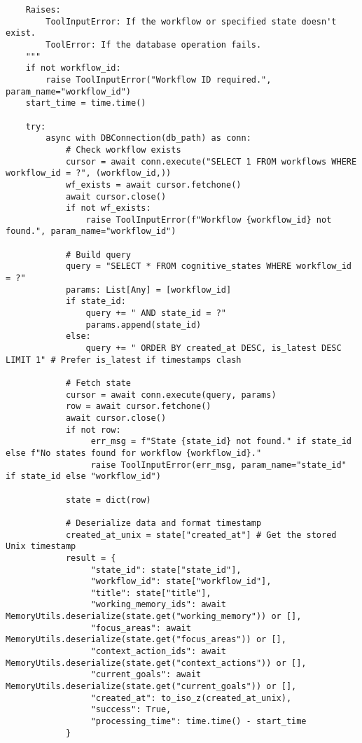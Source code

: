 \documentclass[12pt,a4paper]{article}
\begin{document}
\begin{pageablecode}
\begin{verbatim}
    Raises:
        ToolInputError: If the workflow or specified state doesn't exist.
        ToolError: If the database operation fails.
    """
    if not workflow_id:
        raise ToolInputError("Workflow ID required.", param_name="workflow_id")
    start_time = time.time()

    try:
        async with DBConnection(db_path) as conn:
            # Check workflow exists
            cursor = await conn.execute("SELECT 1 FROM workflows WHERE workflow_id = ?", (workflow_id,))
            wf_exists = await cursor.fetchone()
            await cursor.close()
            if not wf_exists:
                raise ToolInputError(f"Workflow {workflow_id} not found.", param_name="workflow_id")

            # Build query
            query = "SELECT * FROM cognitive_states WHERE workflow_id = ?"
            params: List[Any] = [workflow_id]
            if state_id:
                query += " AND state_id = ?"
                params.append(state_id)
            else:
                query += " ORDER BY created_at DESC, is_latest DESC LIMIT 1" # Prefer is_latest if timestamps clash

            # Fetch state
            cursor = await conn.execute(query, params)
            row = await cursor.fetchone()
            await cursor.close()
            if not row:
                 err_msg = f"State {state_id} not found." if state_id else f"No states found for workflow {workflow_id}."
                 raise ToolInputError(err_msg, param_name="state_id" if state_id else "workflow_id")

            state = dict(row)

            # Deserialize data and format timestamp
            created_at_unix = state["created_at"] # Get the stored Unix timestamp
            result = {
                 "state_id": state["state_id"],
                 "workflow_id": state["workflow_id"],
                 "title": state["title"],
                 "working_memory_ids": await MemoryUtils.deserialize(state.get("working_memory")) or [],
                 "focus_areas": await MemoryUtils.deserialize(state.get("focus_areas")) or [],
                 "context_action_ids": await MemoryUtils.deserialize(state.get("context_actions")) or [],
                 "current_goals": await MemoryUtils.deserialize(state.get("current_goals")) or [],
                 "created_at": to_iso_z(created_at_unix),
                 "success": True,
                 "processing_time": time.time() - start_time
            }


\end{verbatim}
\end{pageablecode}
\end{document}
